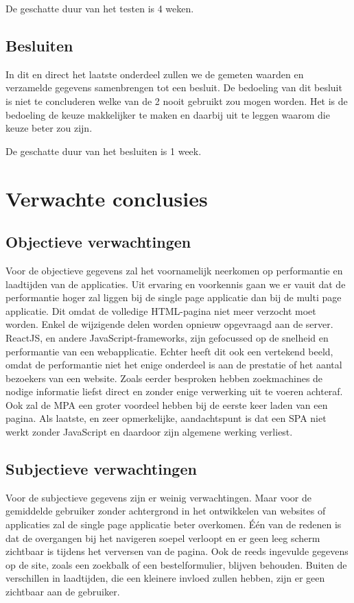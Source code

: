 \documentclass{hogent-article}
\begin{document}
De geschatte duur van het testen is 4 weken.

\subsection{Besluiten}
In dit en direct het laatste onderdeel zullen we de gemeten waarden en verzamelde gegevens samenbrengen tot een besluit.
De bedoeling van dit besluit is niet te concluderen welke van de 2 nooit gebruikt zou mogen worden.
Het is de bedoeling de keuze makkelijker te maken en daarbij uit te leggen waarom die keuze beter zou zijn.

De geschatte duur van het besluiten is 1 week.


\section{Verwachte conclusies}

\subsection{Objectieve verwachtingen}
Voor de objectieve gegevens zal het voornamelijk neerkomen op performantie en laadtijden van de applicaties.
Uit ervaring en voorkennis gaan we er vauit dat de performantie hoger zal liggen bij de single page applicatie dan bij de multi page applicatie.
Dit omdat de volledige HTML-pagina niet meer verzocht moet worden. Enkel de wijzigende delen worden opnieuw opgevraagd aan de server.
ReactJS, en andere JavaScript-frameworks, zijn gefocussed op de snelheid en performantie van een webapplicatie.
Echter heeft dit ook een vertekend beeld, omdat de performantie niet het enige onderdeel is aan de prestatie of het aantal bezoekers van een website.
Zoals eerder besproken hebben zoekmachines de nodige informatie liefst direct en zonder enige verwerking uit te voeren achteraf.
Ook zal de MPA een groter voordeel hebben bij de eerste keer laden van een pagina.
Als laatste, en zeer opmerkelijke, aandachtspunt is dat een SPA niet werkt zonder JavaScript en daardoor zijn algemene werking verliest.

\subsection{Subjectieve verwachtingen}
Voor de subjectieve gegevens zijn er weinig verwachtingen.
Maar voor de gemiddelde gebruiker zonder achtergrond in het ontwikkelen van websites of applicaties zal de single page applicatie beter overkomen.
Één van de redenen is dat de overgangen bij het navigeren soepel verloopt en er geen leeg scherm zichtbaar is tijdens het verversen van de pagina.
Ook de reeds ingevulde gegevens op de site, zoals een zoekbalk of een bestelformulier, blijven behouden.
Buiten de verschillen in laadtijden, die een kleinere invloed zullen hebben, zijn er geen zichtbaar aan de gebruiker.
\end{document}
